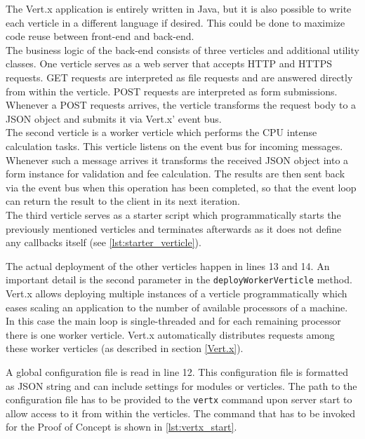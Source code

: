 The Vert.x application is entirely written in Java, but it is also possible to
write each verticle in a different language if desired. This could be done to
maximize code reuse between front-end and back-end.\\
The business logic of the back-end consists of three verticles and additional
utility classes.
One verticle serves as a web server that accepts HTTP and HTTPS requests. GET
requests are interpreted as file requests and are answered directly from within
the verticle. POST requests are interpreted as form submissions. Whenever a POST
requests arrives, the verticle transforms the request body to a JSON object and
submits it via Vert.x' event bus.\\
The second verticle is a worker verticle which performs the CPU intense calculation
tasks. This verticle listens on the event bus for incoming messages. Whenever
such a message arrives it transforms the received JSON object into a form
instance for validation and fee calculation. The results are then sent back via
the event bus when this operation has been completed, so that the event loop can return
the result to the client in its next iteration.\\
The third verticle serves as a starter script which programmatically starts
the previously mentioned verticles and terminates afterwards as it does not
define any callbacks itself (see \autoref{lst:starter_verticle}).



The actual deployment of the other verticles happen in lines 13 and 14.
An important detail is the second parameter in the \texttt{deployWorkerVerticle} method.
Vert.x allows deploying multiple instances of a verticle programmatically
which eases scaling an application to the number of available processors of a machine.
In this case the main loop is single-threaded and for each remaining processor
there is one worker verticle. Vert.x automatically distributes requests among
these worker verticles (as described in section \ref{Vert.x}).

A global configuration file is read in line 12. This configuration file is
formatted as JSON string and can include settings for modules or verticles. The
path to the configuration file has to be provided to the \texttt{vertx} command
upon server start to allow access to it from within the verticles.
The command that has to be invoked for the Proof of Concept is shown in \autoref{lst:vertx_start}.

